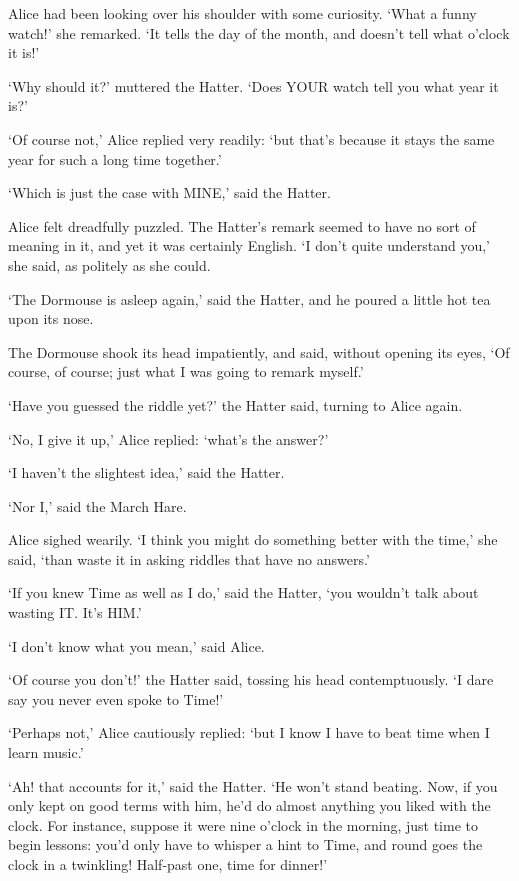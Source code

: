 \documentclass[12pt]{article}
\begin{document}
\begin{Parallel}[p]{}{}
{Alice had been looking over his shoulder with some curiosity. ‘What a funny watch!’ she remarked. ‘It tells the day of the month, and doesn’t tell what o’clock it is!’

‘Why should it?’ muttered the Hatter. ‘Does YOUR watch tell you what year it is?’

‘Of course not,’ Alice replied very readily: ‘but that’s because it stays the same year for such a long time together.’

‘Which is just the case with MINE,’ said the Hatter.

Alice felt dreadfully puzzled. The Hatter’s remark seemed to have no sort of meaning in it, and yet it was certainly English. ‘I don’t quite understand you,’ she said, as politely as she could.

‘The Dormouse is asleep again,’ said the Hatter, and he poured a little hot tea upon its nose.

The Dormouse shook its head impatiently, and said, without opening its eyes, ‘Of course, of course; just what I was going to remark myself.’

‘Have you guessed the riddle yet?’ the Hatter said, turning to Alice again.

‘No, I give it up,’ Alice replied: ‘what’s the answer?’

‘I haven’t the slightest idea,’ said the Hatter.

‘Nor I,’ said the March Hare.

Alice sighed wearily. ‘I think you might do something better with the time,’ she said, ‘than waste it in asking riddles that have no answers.’

‘If you knew Time as well as I do,’ said the Hatter, ‘you wouldn’t talk about wasting IT. It’s HIM.’

‘I don’t know what you mean,’ said Alice.

‘Of course you don’t!’ the Hatter said, tossing his head contemptuously. ‘I dare say you never even spoke to Time!’

‘Perhaps not,’ Alice cautiously replied: ‘but I know I have to beat time when I learn music.’

‘Ah! that accounts for it,’ said the Hatter. ‘He won’t stand beating. Now, if you only kept on good terms with him, he’d do almost anything you liked with the clock. For instance, suppose it were nine o’clock in the morning, just time to begin lessons: you’d only have to whisper a hint to Time, and round goes the clock in a twinkling! Half-past one, time for dinner!’

}
\end{Parallel}
\end{document}
